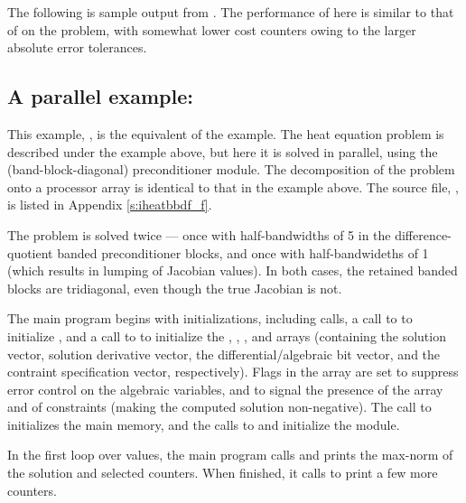The following is sample output from .
The performance of {\fida} here is similar to that of {\ida} on
the  problem, with somewhat lower cost counters owing to
the larger absolute error tolerances.



\subsection{A parallel example: }\label{ss:iheatbbdf}

This example, , is the {\F} equivalent of the 
example.  The heat equation problem is described under the 
example above, but here it is solved in parallel, using the {\idabbdpre}
(band-block-diagonal) preconditioner module.  The decomposition of the
problem onto a processor array is identical to that in the 
example above.  The source file, , is listed in
Appendix \ref{s:iheatbbdf_f}.

The problem is solved twice --- once with half-bandwidths of 5 in the
difference-quotient banded preconditioner blocks, and once with
half-bandwideths of 1 (which results in lumping of Jacobian values).
In both cases, the retained banded blocks are tridiagonal, even though
the true Jacobian is not.

The main program begins with initializations, including {\mpi} calls,
a call to  to initialize {\nvecp}, and a call to
 to initialize the , , , and
 arrays (containing the solution vector, solution derivative vector,
the differential/algebraic bit vector, and the contraint specification
vector, respectively).  Flags in the  array are set to suppress error
control on the algebraic variables, and to signal the presence of the 
array and of constraints (making the computed solution non-negative).
The call to  initializes the {\fida} main memory, and
the calls to  and  initialize the
{\fidabbd} module.

In the first loop over  values, the main program calls 
and prints the max-norm of the solution and selected counters.  When finished,
it calls  to print a few more counters.


